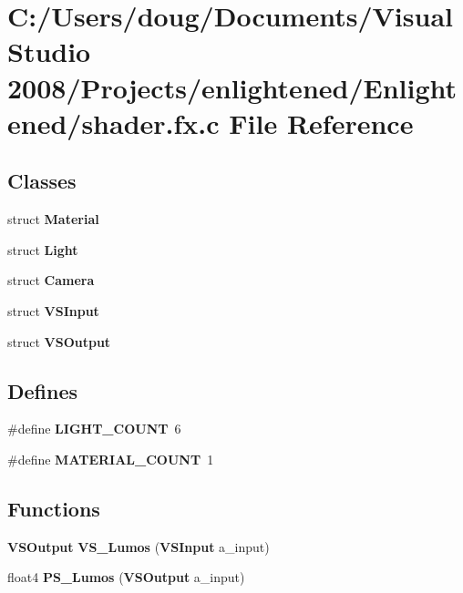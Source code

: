 \section{C:/Users/doug/Documents/Visual Studio 2008/Projects/enlightened/Enlightened/shader.fx.c File Reference}
\label{shader_8fx_8c}
\subsection*{Classes}
\begin{DoxyCompactItemize}
\item 
struct {\bf Material}
\item 
struct {\bf Light}
\item 
struct {\bf Camera}
\item 
struct {\bf VSInput}
\item 
struct {\bf VSOutput}
\end{DoxyCompactItemize}
\subsection*{Defines}
\begin{DoxyCompactItemize}
\item 
\#define {\bf LIGHT\_\-COUNT}~6
\item 
\#define {\bf MATERIAL\_\-COUNT}~1
\end{DoxyCompactItemize}
\subsection*{Functions}
\begin{DoxyCompactItemize}
\item 
{\bf VSOutput} {\bf VS\_\-Lumos} ({\bf VSInput} a\_\-input)
\item 
float4 {\bf PS\_\-Lumos} ({\bf VSOutput} a\_\-input)
\end{DoxyCompactItemize}

